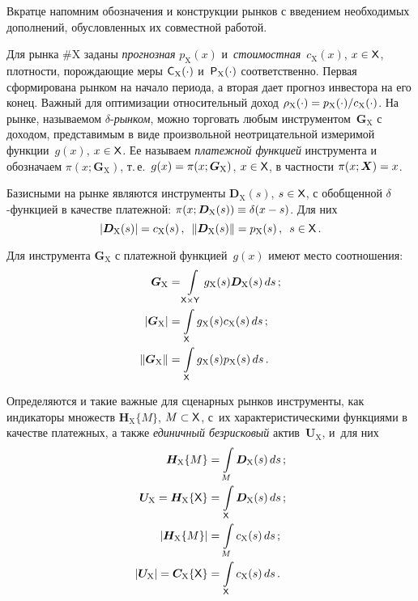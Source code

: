 \begin{multicols}{2}
  Вкратце напомним обозначения и конструкции рынков с введением 
необходимых дополнений, обусловленных их совместной работой. 
  
  Для рынка \#X заданы \textit{прогнозная} $p_{\mathrm{X}}(x)$ 
и~\textit{стоимостная}~$c_{\mathrm{X}}(x)$, $x\hm\in {\sf X}$, плотности, 
порождающие меры ${\sf C}_{\mathrm{X}}(\cdot)$ и~${\sf 
P}_{\mathrm{X}}(\cdot)$ соответственно. Первая сформирована рынком на 
начало периода, а вторая дает прогноз инвестора на его конец. Важный для 
оптимизации относительный доход $\rho_{\mathrm{X}}(\cdot)\hm=  
p_{\mathrm{X}}(\cdot)/c_{\mathrm{X}}(\cdot)$. На рынке, называемом  
$\delta$-\textit{рын\-ком}, можно торговать любым 
инструментом~$\boldsymbol{G}_{\mathrm{X}}$ с доходом, представимым в виде 
произвольной неотрицательной измеримой функции~$g(x)$, $x\hm\in {\sf X}$. 
Ее называем \textit{платежной функцией} инструмента и обозначаем $\pi(x; 
\boldsymbol{G}_{\mathrm{X}})$, т.\,е.\ $g(x) \hm= \pi(x; 
\boldsymbol{G}_{\mathrm{X}})$, $x\hm\in {\sf X}$, в частности $\pi(x; 
\boldsymbol{X})\hm = x$. 
  
  Базисными на рынке являются инструменты 
$\boldsymbol{D}_{\mathrm{X}}(s)$, $s \hm\in {\sf  X}$, с обобщенной  
$\delta$-функ\-ци\-ей в качестве платежной: $\pi(x; 
\boldsymbol{D}_{\mathrm{X}}(s)) \hm\equiv  \delta(x \hm- s)$. Для них 
  $$\left\vert \boldsymbol{D}_{\mathrm{X}}(s)\right\vert 
=c_{\mathrm{X}}(s)\,,\enskip \left\| 
\boldsymbol{D}_{\mathrm{X}}(s)\right\| =p_{\mathrm{X}}(s)\,,\enskip s\in 
{\sf X}\,.
  $$
  
  Для инструмента $\boldsymbol{G}_{\mathrm{X}}$ с платежной 
функцией~$g(x)$ имеют место соотношения: 
  \begin{align*}
  \boldsymbol{G}_{\mathrm{X}} &= \int\limits_{{\sf X}\times{\sf Y}} 
g_{\mathrm{X}}(s) \boldsymbol{D}_{\mathrm{X}}(s)\,ds\,; \\
  \left\vert \boldsymbol{G}_{\mathrm{X}}\right\vert &=\int\limits_{\sf X} 
g_{\mathrm{X}}(s)c_{\mathrm{X}}(s)\,ds\,;\\
  \left\| \boldsymbol{G}_{\mathrm{X}}\right\| &=\int\limits_{\sf X} 
g_{\mathrm{X}}(s) p_{\mathrm{X}}(s)\,ds\,.
  \end{align*}
  
  Определяются и такие важные для сценарных рынков инструменты, как 
индикаторы множеств $\boldsymbol{H}_{\mathrm{X}}\{M\}$, $M \hm\subset 
{\sf X}$, с~их характеристическими функциями в качестве платежных, а также 
\textit{единичный безрисковый} актив~$\boldsymbol{U}_{\mathrm{X}}$, и~для 
них
  \begin{align*}
  \boldsymbol{H}_{\mathrm{X}}\{M\} &= \int\limits_M 
\boldsymbol{D}_{\mathrm{X}}(s)\,ds\,;\\  
\boldsymbol{U}_{\mathrm{X}} = 
\boldsymbol{H}_{\mathrm{X}}\{{\sf X}\}& =\int\limits_{\sf X} 
\boldsymbol{D}_{\mathrm{X}}(s)\,ds\,;\\
  \left\vert \boldsymbol{H}_{\mathrm{X}}\{M\}\right\vert &= \int\limits_M 
c_{\mathrm{X}}(s)\,ds\,;\\
  \left\vert 
\boldsymbol{U}_{\mathrm{X}}\right\vert
   = \boldsymbol{C}_{\mathrm{X}}\{{\sf X}\} &=\int\limits_{\sf X} 
c_{\mathrm{X}}(s)\,ds\,.
  \end{align*}
  

\end{multicols}
